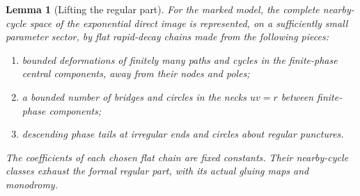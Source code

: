\documentclass[11pt]{article}
\newtheorem{lemma}[theorem]{Lemma}
\theoremstyle{definition}\newtheorem{definition}[theorem]{Definition}
\theoremstyle{remark}\newtheorem{remark}[theorem]{Remark}
\begin{document}
\begin{lemma}[Lifting the regular part]\label{lem:regularlifting}
For the marked model, the complete nearby-cycle space of the
exponential direct image is represented, on a sufficiently small
parameter sector, by flat rapid-decay chains made from the following
pieces:
\begin{enumerate}
\item bounded deformations of finitely many paths and cycles in
the finite-phase central components, away from their nodes and poles;
\item a bounded number of bridges and circles in the necks
$uv=r$ between finite-phase components;
\item descending phase tails at irregular ends and circles about
regular punctures.
\end{enumerate}
The coefficients of each chosen flat chain are fixed constants.
Their nearby-cycle classes exhaust the formal regular part, with
its actual gluing maps and monodromy.
\end{lemma}
\end{document}

